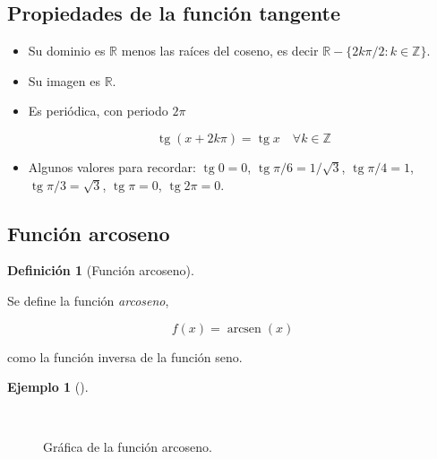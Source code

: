 \documentclass[
  a4paper,
]{scrreport}
\theoremstyle{plain}
\theoremstyle{plain}
\theoremstyle{definition}
\newtheorem{definition}{Definición}[chapter]
\theoremstyle{definition}
\newtheorem{example}{Ejemplo}[chapter]
\theoremstyle{plain}
\theoremstyle{remark}
\begin{document}
\hypertarget{propiedades-de-la-funciuxf3n-tangente}{%
\subsection{Propiedades de la función
tangente}\label{propiedades-de-la-funciuxf3n-tangente}}

\begin{itemize}
\item
  Su dominio es \(\mathbb{R}\) menos las raíces del coseno, es decir
  \(\mathbb{R}-\{2k\pi/2: k\in \mathbb{Z}\}\).
\item
  Su imagen es \(\mathbb{R}\).
\item
  Es periódica, con periodo \(2\pi\)

  \[\operatorname{tg} (x+2k\pi)= \operatorname{tg} x\quad \forall k\in \mathbb{Z}\]
\item
  Algunos valores para recordar: \(\operatorname{tg} 0=0\),
  \(\operatorname{tg} \pi/6= 1/\sqrt{3}\),
  \(\operatorname{tg} \pi/4=1\), \(\operatorname{tg} \pi/3= \sqrt{3}\),
  \(\operatorname{tg} \pi =0\), \(\operatorname{tg} 2\pi=0\).
\end{itemize}

\hypertarget{funciuxf3n-arcoseno}{%
\subsection{Función arcoseno}\label{funciuxf3n-arcoseno}}

\leavevmode{}%
\begin{definition}[Función arcoseno]\label{def-funcion-arcoseno}

Se define la función \emph{arcoseno},

\[f(x)=\operatorname{arcsen}(x)\]

como la función inversa de la función seno.

\end{definition}

\leavevmode{}%
\begin{example}[]\label{exm-funcion-arcoseno}

~

\begin{figure}

{\centering 



}

\caption{Gráfica de la función arcoseno.}

\end{figure}

\end{example}
\end{document}
